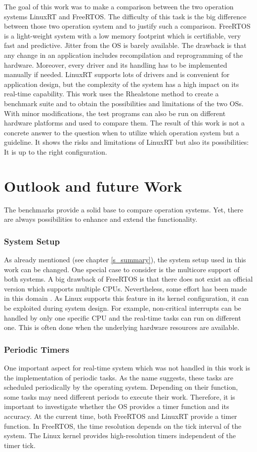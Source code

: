 The goal of this work was to make a comparison between the two operation systems LinuxRT and FreeRTOS. 
The difficulty of this task is the big difference between those two operation system and to justify such a comparison.
FreeRTOS is a light-weight system with a low memory footprint which is certifiable, very fast and predictive. 
Jitter from the \ac{OS} is barely available. 
The drawback is that any change in an application includes recompilation and reprogramming of the hardware.
Moreover, every driver and its handling has to be implemented manually if needed.
LinuxRT supports lots of drivers and is convenient for application design, but the complexity of the system has a high impact on its real-time capability.
This work uses the Rhealstone method to create a benchmark suite and to obtain the possibilities and limitations of the two \acp{OS}.
With minor modifications, the test programs can also be run on different hardware platforms and used to compare  them.
The result of this work is not a concrete answer to the question when to utilize which operation system but a guideline.
It shows the risks and limitations of LinuxRT but also its possibilities: It is up to the right configuration. 

\section{Outlook and future Work}
The benchmarks provide a solid base to compare operation systems.
Yet, there are always possibilities to enhance and extend the functionality.

\subsubsection{System Setup}
As already mentioned (see chapter \ref{s_summary}), the system setup used in this work can be changed.
One special case to consider is the multicore support of both systems.
A big drawback of FreeRTOS is that there does not exist an official version which supports multiple \acp{CPU}.
Nevertheless, some effort has been made in this domain \cite{mistry:affmaer}.
As Linux supports this feature in its kernel configuration, it can be exploited during system design.
For example, non-critical interrupts can be handled by only one specific \ac{CPU} and the real-time tasks can run on different one.
This is often done when the underlying hardware resources are available. 

\subsubsection{Periodic Timers}
One important aspect for real-time system which was not handled in this work is the implementation of periodic tasks.
As the name suggests, these tasks are scheduled periodically by the operating system.
Depending on their function, some tasks may need different periods to execute their work.
Therefore, it is important to investigate whether the \ac{OS} provides a timer function and its accuracy.
At the current time, both FreeRTOS and LinuxRT provide a timer function.
In FreeRTOS, the time resolution depends on the tick interval of the system.
The Linux kernel provides high-resolution timers independent of the timer tick.

